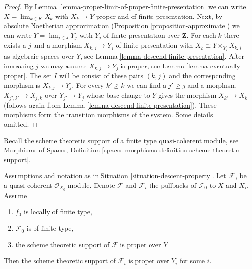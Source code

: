 \begin{proof}
By Lemma \ref{lemma-proper-limit-of-proper-finite-presentation}
we can write $X = \lim_{k \in K} X_k$ with $X_k \to Y$ proper and
of finite presentation. Next, by absolute Noetherian approximation
(Proposition \ref{proposition-approximate}) we can
write $Y = \lim_{j \in J} Y_j$ with $Y_j$ of finite presentation
over $\mathbf{Z}$.
For each $k$ there exists a $j$ and a morphism $X_{k, j} \to Y_j$
of finite presentation with $X_k \cong Y \times_{Y_j} X_{k, j}$
as algebraic spaces over $Y$, see
Lemma \ref{lemma-descend-finite-presentation}.
After increasing $j$ we may assume $X_{k, j} \to Y_j$ is proper, see
Lemma \ref{lemma-eventually-proper}. The set $I$ will be consist
of these pairs $(k, j)$ and the corresponding morphism is $X_{k, j} \to Y_j$.
For every $k' \geq k$ we can find a $j' \geq j$ and a morphism
$X_{j', k'} \to X_{j, k}$ over $Y_{j'} \to Y_j$ whose base change to $Y$
gives the morphism $X_{k'} \to X_k$ (follows again from
Lemma \ref{lemma-descend-finite-presentation}).
These morphisms form the transition morphisms of the system. Some details
omitted.
\end{proof}

\noindent
Recall the scheme theoretic support of
a finite type quasi-coherent module, see
Morphisms of Spaces, Definition
\ref{spaces-morphisms-definition-scheme-theoretic-support}.

\begin{lemma}
\label{lemma-eventually-proper-support}
Assumptions and notation as in Situation \ref{situation-descent-property}.
Let $\mathcal{F}_0$ be a quasi-coherent $\mathcal{O}_{X_0}$-module.
Denote $\mathcal{F}$ and $\mathcal{F}_i$ the pullbacks of
$\mathcal{F}_0$ to $X$ and $X_i$. Assume
\begin{enumerate}
\item $f_0$ is locally of finite type,
\item $\mathcal{F}_0$ is of finite type,
\item the scheme theoretic support of $\mathcal{F}$ is proper over $Y$.
\end{enumerate}
Then the scheme theoretic support of $\mathcal{F}_i$ is proper over $Y_i$
for some $i$.
\end{lemma}

